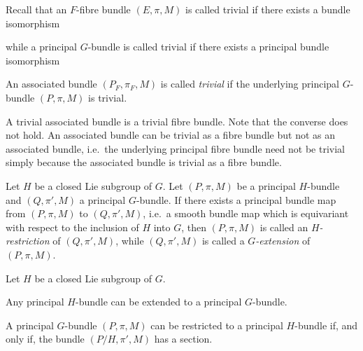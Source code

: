 \noindent Recall that an $F$-fibre bundle $(E,\pi,M)$ is called trivial if there exists a bundle isomorphism
\bse
{}
\ese
while a principal $G$-bundle is called trivial if there exists a principal bundle isomorphism
\bse
{}
\ese

\bd
An associated bundle $(P_F,\pi_F,M)$ is called \emph{trivial} if the underlying principal $G$-bundle $(P,\pi,M)$ is trivial.
\ed

\bp
A trivial associated bundle is a trivial fibre bundle.
\ep
Note that the converse does not hold. An associated bundle can be trivial as a fibre bundle but not as an associated bundle, i.e.\ the underlying principal fibre bundle need not be trivial simply because the associated bundle is trivial as a fibre bundle.


\bd
Let $H$ be a closed Lie subgroup of $G$. Let $(P,\pi,M)$ be a principal $H$-bundle and $(Q,\pi',M)$ a principal $G$-bundle. If there exists a principal bundle map from $(P,\pi,M)$ to $(Q,\pi',M)$, i.e.\ a smooth bundle map which is equivariant with respect to the inclusion of $H$ into $G$, then $(P,\pi,M)$ is called an \emph{$H$-restriction} of $(Q,\pi',M)$, while $(Q,\pi',M)$ is called a \emph{$G$-extension} of $(P,\pi,M)$.  
\ed

\bt
Let $H$ be a closed Lie subgroup of $G$.
\ben[label=\roman*)]
\item Any principal $H$-bundle can be extended to a principal $G$-bundle.
\item A principal $G$-bundle $(P,\pi,M)$ can be restricted to a principal $H$-bundle if, and only if, the bundle $(P/H,\pi',M)$ has a section.
\een
\et

